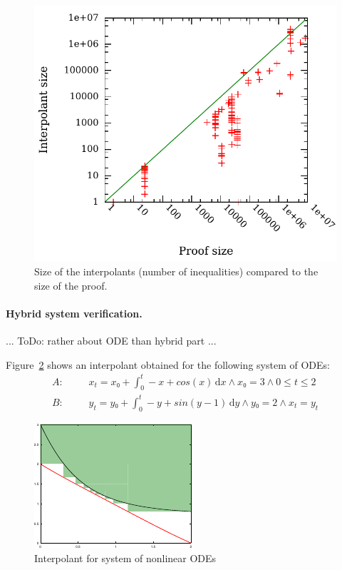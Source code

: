 \begin{figure}
\centering
\includegraphics[scale=0.6]{img/itpsize2.pdf}
\caption{
    Size of the interpolants (number of inequalities) compared to the size of the proof.
}
\label{fig:flyspeck}
\end{figure}


\paragraph{Hybrid system verification.}
... ToDo: rather about ODE than hybrid part ...

Figure~\ref{fig:ode} shows an interpolant obtained for the following system of ODEs:
\begin{eqnarray*}
A: &~~~~&  x_t = x₀ + \int_0^t \! -x + cos(x) \, \mathrm{d}x ∧ x₀ = 3 ∧ 0 ≤ t ≤ 2 \\
B: &~~~~&  y_t = y₀ + \int_0^t \! -y + sin(y-1) \, \mathrm{d}y ∧ y₀ = 2 ∧ x_t = y_t
\end{eqnarray*}

\begin{figure}
\centering
\includegraphics[scale=1.5]{img/ode.pdf}
\caption{ Interpolant for system of nonlinear ODEs }
\label{fig:ode}
\end{figure}

